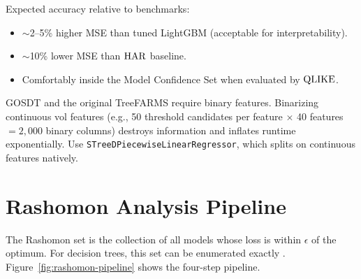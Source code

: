 Expected accuracy relative to benchmarks:
\begin{itemize}[nosep]
  \item $\sim$2--5\% higher MSE than tuned LightGBM (acceptable for interpretability).
  \item $\sim$10\% lower MSE than $\operatorname{HAR}$ baseline.
  \item Comfortably inside the Model Confidence Set when evaluated by $\operatorname{QLIKE}$.
\end{itemize}

\begin{warning}
GOSDT and the original TreeFARMS require binary features.
Binarizing continuous vol features (e.g., 50 threshold candidates per feature $\times$ 40 features $= 2{,}000$ binary columns) destroys information and inflates runtime exponentially.
Use \texttt{STreeDPiecewiseLinearRegressor}, which splits on continuous features natively.
\end{warning}


\section{Rashomon Analysis Pipeline}
\label{sec:rashomon-pipeline}

The Rashomon set is the collection of all models whose loss is within $\epsilon$ of the optimum.
For decision trees, this set can be enumerated exactly \citep{XinEtAl2022}.
Figure~\ref{fig:rashomon-pipeline} shows the four-step pipeline.

